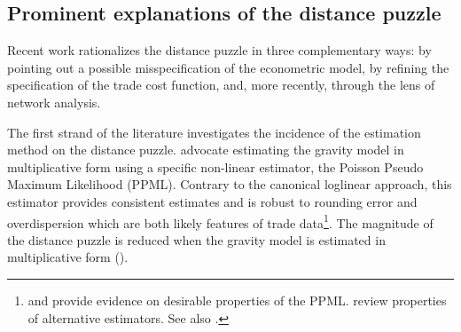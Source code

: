\documentclass[12pt,twoside,a4paper,notitlepage]{article}
\begin{document}
\subsection*{Prominent explanations of the distance puzzle}
Recent work rationalizes the distance puzzle in three complementary ways: by pointing out a possible misspecification of the econometric model, by refining the specification of the trade cost function, and, more recently, through the lens of network analysis. 

The first strand of the literature investigates the incidence of the estimation method on the distance puzzle. \cite{Silva2006} advocate estimating the gravity model in multiplicative form using a specific non-linear estimator, the Poisson Pseudo Maximum Likelihood (PPML). Contrary to the canonical loglinear approach, this estimator provides consistent estimates and is robust to rounding error and overdispersion which are both likely features of trade data\footnote{\cite{SantosSilva2011} and \cite{Fally2015} provide evidence on desirable properties of the PPML. 
 \cite{Head2014} review properties of alternative estimators. See also \cite{Bosquet2015,Bosquet2014}.}. The magnitude of the distance puzzle is reduced when the gravity model is estimated in multiplicative form (\cite{Bosquet2015, Head2013}). 
\end{document}
